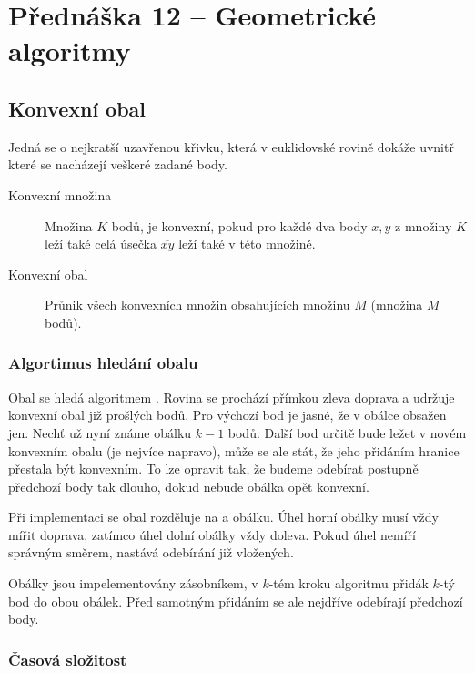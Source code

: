 \section{Přednáška 12 -- Geometrické algoritmy}

\subsection{Konvexní obal}

Jedná se o nejkratší uzavřenou křivku, která v euklidovské rovině dokáže uvnitř které se nacházejí veškeré zadané body.

\begin{description}
    \item[Konvexní množina] Množina $K$ bodů, je konvexní, pokud pro každé dva body $x, y$ z množiny $K$ leží také celá úsečka $\overline{xy}$ leží také v této množině.
    \item[Konvexní obal] Průnik všech konvexních množin obsahujících množinu $M$ (množina $M$ bodů).
\end{description}

\subsubsection{Algortimus hledání obalu}\label{alg:konvexni-obal}

Obal se hledá algoritmem .
Rovina se prochází přímkou zleva doprava a udržuje konvexní obal již prošlých bodů.
Pro výchozí bod je jasné, že v obálce obsažen jen.
Nechť už nyní známe obálku $k-1$ bodů.
Další bod určitě bude ležet v novém konvexním obalu (je nejvíce napravo), může se ale stát, že jeho přidáním hranice přestala být konvexním.
To lze opravit tak, že budeme odebírat postupně předchozí body tak dlouho, dokud nebude obálka opět konvexní.

Při implementaci se obal rozděluje na  a  obálku.
Úhel horní obálky musí vždy mířit doprava, zatímco úhel dolní obálky vždy doleva.
Pokud úhel nemíří správným směrem, nastává odebírání již vložených.

Obálky jsou impelementovány zásobníkem, v $k$-tém kroku algoritmu přidák $k$-tý bod do obou obálek.
Před samotným přidáním se ale nejdříve odebírají předchozí body.

\subsubsection{Časová složitost}

